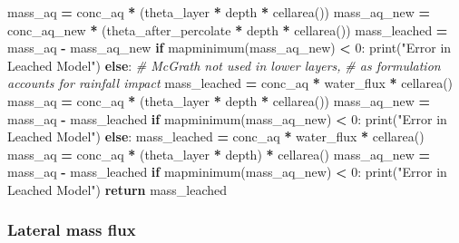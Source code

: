 \documentclass[]{article}
\newenvironment{Shaded}{\begin{snugshade}}{\end{snugshade}}
\newcommand{\DecValTok}[1]{\textcolor[rgb]{0.00,0.00,0.81}{#1}}
\newcommand{\StringTok}[1]{\textcolor[rgb]{0.31,0.60,0.02}{#1}}
\newcommand{\CommentTok}[1]{\textcolor[rgb]{0.56,0.35,0.01}{\textit{#1}}}
\newcommand{\ControlFlowTok}[1]{\textcolor[rgb]{0.13,0.29,0.53}{\textbf{#1}}}
\newcommand{\OperatorTok}[1]{\textcolor[rgb]{0.81,0.36,0.00}{\textbf{#1}}}
\newcommand{\BuiltInTok}[1]{#1}
\newcommand{\NormalTok}[1]{#1}
\begin{document}
\begin{Shaded}
\begin{Highlighting}[]
\NormalTok{            mass_aq }\OperatorTok{=}\NormalTok{ conc_aq }\OperatorTok{*}\NormalTok{ (theta_layer }\OperatorTok{*}\NormalTok{ depth }\OperatorTok{*}\NormalTok{ cellarea())}
\NormalTok{            mass_aq_new }\OperatorTok{=}\NormalTok{ conc_aq_new }\OperatorTok{*}\NormalTok{ (theta_after_percolate }\OperatorTok{*}\NormalTok{ depth }\OperatorTok{*}\NormalTok{ cellarea())}
\NormalTok{            mass_leached }\OperatorTok{=}\NormalTok{ mass_aq }\OperatorTok{-}\NormalTok{ mass_aq_new}
            \ControlFlowTok{if}\NormalTok{ mapminimum(mass_aq_new) }\OperatorTok{<} \DecValTok{0}\NormalTok{:}
                \BuiltInTok{print}\NormalTok{(}\StringTok{"Error in Leached Model"}\NormalTok{)}
        \ControlFlowTok{else}\NormalTok{:}
            \CommentTok{# McGrath not used in lower layers,}
            \CommentTok{# as formulation accounts for rainfall impact}
\NormalTok{            mass_leached }\OperatorTok{=}\NormalTok{ conc_aq }\OperatorTok{*}\NormalTok{ water_flux }\OperatorTok{*}\NormalTok{ cellarea()}
\NormalTok{            mass_aq }\OperatorTok{=}\NormalTok{ conc_aq }\OperatorTok{*}\NormalTok{ (theta_layer }\OperatorTok{*}\NormalTok{ depth }\OperatorTok{*}\NormalTok{ cellarea())}
\NormalTok{            mass_aq_new }\OperatorTok{=}\NormalTok{ mass_aq }\OperatorTok{-}\NormalTok{ mass_leached}
            \ControlFlowTok{if}\NormalTok{ mapminimum(mass_aq_new) }\OperatorTok{<} \DecValTok{0}\NormalTok{:}
                \BuiltInTok{print}\NormalTok{(}\StringTok{"Error in Leached Model"}\NormalTok{)}
    \ControlFlowTok{else}\NormalTok{:}
\NormalTok{        mass_leached }\OperatorTok{=}\NormalTok{ conc_aq }\OperatorTok{*}\NormalTok{ water_flux }\OperatorTok{*}\NormalTok{ cellarea()}
\NormalTok{        mass_aq }\OperatorTok{=}\NormalTok{ conc_aq }\OperatorTok{*}\NormalTok{ (theta_layer }\OperatorTok{*}\NormalTok{ depth) }\OperatorTok{*}\NormalTok{ cellarea()}
\NormalTok{        mass_aq_new }\OperatorTok{=}\NormalTok{ mass_aq }\OperatorTok{-}\NormalTok{ mass_leached}
        \ControlFlowTok{if}\NormalTok{ mapminimum(mass_aq_new) }\OperatorTok{<} \DecValTok{0}\NormalTok{:}
            \BuiltInTok{print}\NormalTok{(}\StringTok{"Error in Leached Model"}\NormalTok{)}
    \ControlFlowTok{return}\NormalTok{ mass_leached}
\end{Highlighting}
\end{Shaded}

\hypertarget{lateral-mass-flux}{%
\subsubsection{Lateral mass flux}\label{lateral-mass-flux}}
\end{document}
